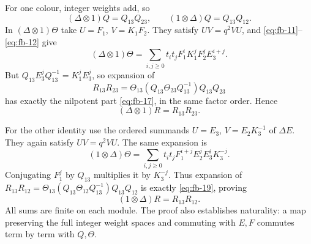 For one colour, integer weights add, so
\begin{equation}\tag{FB16}\label{eq:fb-16}
(\Delta\otimes1)Q=Q_{13}Q_{23},\qquad
 (1\otimes\Delta)Q=Q_{13}Q_{12}.
\end{equation}
In \((\Delta\otimes1)\Theta\) take \(U=F_1\), \(V=K_1F_2\).
They satisfy \(UV=q^2VU\), and \eqref{eq:fb-11}–\eqref{eq:fb-12} give
\begin{equation}\tag{FB17}\label{eq:fb-17}
(\Delta\otimes1)\Theta
 =\sum_{i,j\ge0}t_it_j F_1^iK_1^jF_2^j E_3^{i+j}.
\end{equation}
But \(Q_{13}E_3^jQ_{13}^{-1}=K_1^jE_3^j\), so expansion of
\[
 R_{13}R_{23}
 =\Theta_{13}(Q_{13}\Theta_{23}Q_{13}^{-1})Q_{13}Q_{23}
\]
has exactly the nilpotent part \eqref{eq:fb-17}, in the same factor order. Hence
\begin{equation}\tag{FB18}\label{eq:fb-18}
(\Delta\otimes1)R=R_{13}R_{23}.
\end{equation}

For the other identity use the ordered summands \(U=E_3\),
\(V=E_2K_3^{-1}\) of \(\Delta E\). They again satisfy \(UV=q^2VU\).
The same expansion is
\begin{equation}\tag{FB19}\label{eq:fb-19}
(1\otimes\Delta)\Theta
 =\sum_{i,j\ge0}t_it_j F_1^{i+j}E_2^jE_3^iK_3^{-j}.
\end{equation}
Conjugating \(F_1^j\) by \(Q_{13}\) multiplies it by \(K_3^{-j}\).
Thus expansion of
\(R_{13}R_{12}=\Theta_{13}(Q_{13}\Theta_{12}Q_{13}^{-1})Q_{13}Q_{12}\)
is exactly \eqref{eq:fb-19}, proving
\begin{equation}\tag{FB20}\label{eq:fb-20}
(1\otimes\Delta)R=R_{13}R_{12}.
\end{equation}
All sums are finite on each module. The proof also establishes
naturality: a map preserving the full integer weight spaces and
commuting with \(E,F\) commutes term by term with \(Q,\Theta\).

